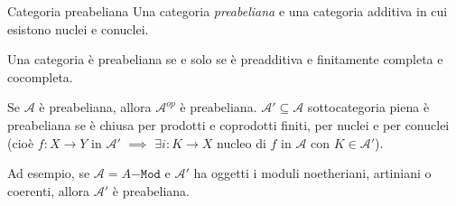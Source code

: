 \begin{definition}{Categoria preabeliana}
    Una categoria \emph{preabeliana} e una categoria additiva in cui esistono
    nuclei e conuclei.
\end{definition}
\begin{remark}{}
    Una categoria è preabeliana se e solo se è preadditiva e finitamente
    completa e cocompleta.
\end{remark}
\begin{remark}{}
    Se \(\mathcal{A}\) è preabeliana, allora \(\mathcal{A}^{op}\) è preabeliana.
    \(\mathcal{A}' \subseteq \mathcal{A}\) sottocategoria piena è preabeliana se
    è chiusa per prodotti e coprodotti finiti, per nuclei e per conuclei (cioè
    \(f: X \to Y\) in \(\mathcal{A}'\) \(\implies \) \(\exists i: K \to X\)
    nucleo di \(f\) in \(\mathcal{A}\) con \(K \in \mathcal{A}'\)).

    Ad esempio, se \(\mathcal{A} = A\mathtt{-Mod}\) e \(\mathcal{A}'\) ha
    oggetti i moduli noetheriani, artiniani o coerenti, allora
    \(\mathcal{A}'\) è preabeliana.
\end{remark}


